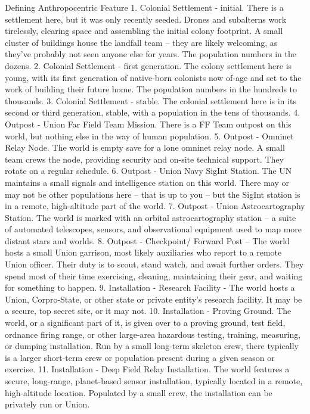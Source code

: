 Defining Anthropocentric Feature
    1.  Colonial Settlement - initial. There is a settlement here, but it was only recently seeded.
        Drones and subalterns work tirelessly, clearing space and assembling the initial colony
        footprint. A small cluster of buildings house the landfall team -- they are likely welcoming,
        as they’ve probably not seen anyone else for years. The population numbers in the
        dozens.
    2.  Colonial Settlement - first generation. The colony settlement here is young, with its first
        generation of native-born colonists now of-age and set to the work of building their future
        home. The population numbers in the hundreds to thousands.
    3.  Colonial Settlement - stable. The colonial settlement here is in its second or third
        generation, stable, with a population in the tens of thousands.
    4.  Outpost - Union Far Field Team Mission. There is a FF Team outpost on this world, but
        nothing else in the way of human population.
    5.  Outpost - Omninet Relay Node. The world is empty save for a lone omninet relay node. A
        small team crews the node, providing security and on-site technical support. They rotate
        on a regular schedule.
    6.  Outpost - Union Navy SigInt Station. The UN maintains a small signals and intelligence
        station on this world. There may or may not be other populations here -- that is up to you --
        but the SigInt station is in a remote, high-altitude part of the world.
    7.  Outpost - Union Astrocartography Station. The world is marked with an orbital
        astrocartography station -- a suite of automated telescopes, sensors, and observational
        equipment used to map more distant stars and worlds.
    8.  Outpost - Checkpoint/ Forward Post -- The world hosts a small Union garrison, most likely
        auxiliaries who report to a remote Union officer. Their duty is to scout, stand watch, and
        await further orders. They spend most of their time exercising, cleaning, maintaining their
        gear, and waiting for something to happen.
    9.  Installation - Research Facility - The world hosts a Union, Corpro-State, or other state or
        private entity’s research facility. It may be a secure, top secret site, or it may not.
    10. Installation - Proving Ground. The world, or a significant part of it, is given over to a
        proving ground, test field, ordnance firing range, or other large-area hazardous testing,
        training, measuring, or dumping installation. Run by a small long-term skeleton crew, there
        typically is a larger short-term crew or population present during a given season or
        exercise.
    11. Installation - Deep Field Relay Installation. The world features a secure, long-range,
        planet-based sensor installation, typically located in a remote, high-altitude location.
        Populated by a small crew, the installation can be privately run or Union.




